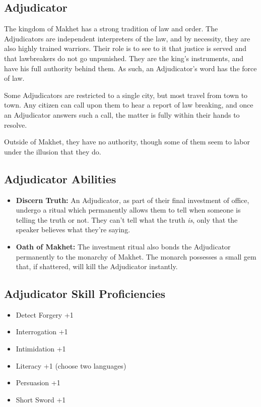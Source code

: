 \begin{multicols}{2}
\section{Adjudicator}

The kingdom of Makhet has a strong tradition of law and order. The
Adjudicators are independent interpreters of the law, and by necessity,
they are also highly trained warriors. Their role is to see to it that
justice is served and that lawbreakers do not go unpunished. They are
the king's instruments, and have his full authority behind them. As
such, an Adjudicator's word has the force of law.

Some Adjudicators are restricted to a single city, but most travel from
town to town. Any citizen can call upon them to hear a report of law
breaking, and once an Adjudicator answers such a call, the matter is
fully within their hands to resolve.

Outside of Makhet, they have no authority, though some of them seem to
labor under the illusion that they do.

\subsection{Adjudicator Abilities}

\begin{itemize}
  \item \textbf{Discern Truth:} An Adjudicator, as part of their final
    investment of office, undergo a ritual which permanently allows them
    to tell when someone is telling the truth or not. They can't tell
    what the truth \textit{is}, only that the speaker believes what
    they're saying.
  \item \textbf{Oath of Makhet:} The investment ritual also bonds the
    Adjudicator permanently to the monarchy of Makhet. The monarch
    possesses a small gem that, if shattered, will kill the Adjudicator
    instantly.
\end{itemize}

\subsection{Adjudicator Skill Proficiencies}

\begin{itemize}
  \item Detect Forgery +1
  \item Interrogation +1
  \item Intimidation +1
  \item Literacy +1 (choose two languages)
  \item Persuasion +1
  \item Short Sword +1
\end{itemize}


\end{multicols}
